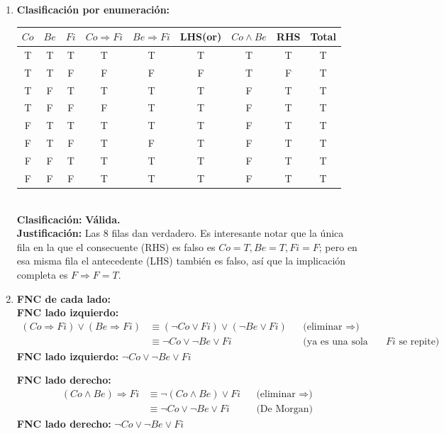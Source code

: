 \begin{enumerate}
    \item \textbf{Clasificación por enumeración:}\\
    \begin{tabular}{ccc|ccc|cc|c}
        \toprule
        $Co$ & $Be$ & $Fi$ & $Co{\Rightarrow}Fi$ & $Be{\Rightarrow}Fi$ & LHS(or) & $Co{\land}Be$ & RHS & Total \\
        \midrule
        T&T&T&T&T&T&T&T&T\\
        T&T&F&F&F&F&T&F&T\\
        T&F&T&T&T&T&F&T&T\\
        T&F&F&F&T&T&F&T&T\\
        F&T&T&T&T&T&F&T&T\\
        F&T&F&T&F&T&F&T&T\\
        F&F&T&T&T&T&F&T&T\\
        F&F&F&T&T&T&F&T&T\\
        \bottomrule
    \end{tabular}\\
    \textbf{Clasificación:} \textbf{Válida.}\\
    \textbf{Justificación:} Las 8 filas dan verdadero. Es interesante notar que la única fila en la
    que el consecuente (RHS) es falso es $Co{=}T,Be{=}T,Fi{=}F$; pero en esa misma fila el antecedente
    (LHS) también es falso, así que la implicación completa es $F\Rightarrow F = T$.

    \item \textbf{FNC de cada lado:}\\
    \textbf{FNC lado izquierdo:}
    \begin{align*}
        (Co\Rightarrow Fi)\lor(Be\Rightarrow Fi) &\equiv (\neg Co\lor Fi)\lor(\neg Be\lor Fi)
        &&\text{(eliminar }\Rightarrow\text{)}\\
        &\equiv \neg Co \lor \neg Be \lor Fi &&\text{(ya es una sola cláusula; $Fi$ se repite)}
    \end{align*}
    \textbf{FNC lado izquierdo:} $\neg Co \lor \neg Be \lor Fi$

    \textbf{FNC lado derecho:}
    \begin{align*}
        (Co\land Be)\Rightarrow Fi &\equiv \neg(Co\land Be)\lor Fi &&\text{(eliminar }\Rightarrow\text{)}\\
        &\equiv \neg Co\lor\neg Be\lor Fi &&\text{(De Morgan)}
    \end{align*}
    \textbf{FNC lado derecho:} $\neg Co \lor \neg Be \lor Fi$


\end{enumerate}
